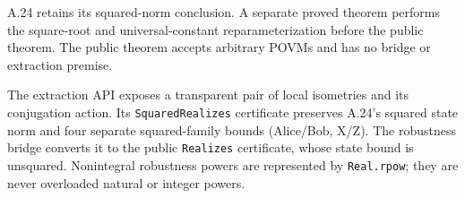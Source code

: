 
A.24 retains its squared-norm conclusion. A separate proved theorem performs
the square-root and universal-constant reparameterization before the public
theorem. The public theorem accepts arbitrary POVMs and has no bridge or
extraction premise.

The extraction API exposes a transparent pair of local isometries and its
conjugation action.  Its \texttt{SquaredRealizes} certificate preserves A.24's
squared state norm and four separate squared-family bounds (Alice/Bob, X/Z).
The robustness bridge converts it to the public \texttt{Realizes} certificate,
whose state bound is unsquared.  Nonintegral robustness powers are represented
by \texttt{Real.rpow}; they are never overloaded natural or integer powers.


